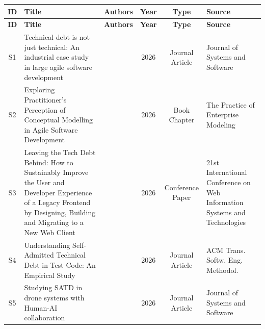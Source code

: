 \documentclass[12pt,reqno, twoside]{amsbook}
\theoremstyle{plain}
\numberwithin{equation}{chapter}
\renewcommand{\thefigure}{\arabic{figure}}
\numberwithin{section}{chapter}
\begin{document}
\renewcommand{\bibname}{References}

\printbibliography

\clearpage
\appendix
\renewcommand{\thefigure}{\thechapter.\arabic{figure}}
\begin{landscape}
\begin{center}
\small
\renewcommand{\arraystretch}{1.1}
\begin{longtable}{|c|p{5cm}|p{4.5cm}|c|c|p{5.5cm}|}
\hline
\textbf{ID} & \textbf{Title} & \textbf{Authors} & \textbf{Year} & \textbf{Type} & \textbf{Source} \\
\hline
\endfirsthead
\hline
\textbf{ID} & \textbf{Title} & \textbf{Authors} & \textbf{Year} & \textbf{Type} & \textbf{Source} \\
\hline
\endhead
\hline
\endfoot
\hline
\endlastfoot

S1  & Technical debt is not just technical: An industrial case study in large agile software development & \citeauthor{Ahmad2026} & 2026 & Journal Article & Journal of Systems and Software \\
S2  & Exploring Practitioner’s Perception of Conceptual Modelling in Agile Software Development & \citeauthor{Granados-Hondares2026} & 2026 & Book Chapter & The Practice of Enterprise Modeling \\
S3  & Leaving the Tech Debt Behind: How to Sustainably Improve the User and Developer Experience of a Legacy Frontend by Designing, Building and Migrating to a New Web Client & \citeauthor{Maiwald2026} & 2026 & Conference Paper & 21st International Conference on Web Information Systems and Technologies \\
S4  & Understanding Self-Admitted Technical Debt in Test Code: An Empirical Study & \citeauthor{Nakamura2026} & 2026 & Journal Article & ACM Trans. Softw. Eng. Methodol. \\
S5  & Studying {SATD} in drone systems with Human-{AI} collaboration & \citeauthor{Rantala2026} & 2026 & Journal Article & Journal of Systems and Software \\


\end{longtable}
\end{center}
\end{landscape}
\end{document}
